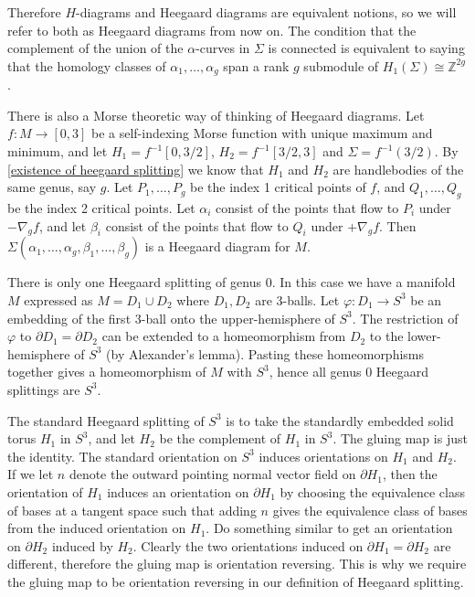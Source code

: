 Therefore $H$-diagrams and Heegaard diagrams are equivalent notions, so we will refer to both as Heegaard diagrams from now on. The condition that the complement of the union of the $\alpha$-curves in $\Sigma$ is connected is equivalent to saying that the homology classes of $\alpha_1,\ldots,\alpha_g$ span a rank $g$ submodule of $H_1(\Sigma) \cong \mathbb Z^{2g}$. 

There is also a Morse theoretic way of thinking of Heegaard diagrams. Let $f : M \rightarrow [0,3]$ be a self-indexing Morse function with unique maximum and minimum, and let $H_1 = f^{-1}[0,3/2]$, $H_2 = f^{-1}[3/2,3]$ and $\Sigma = f^{-1}(3/2)$. By \cref{existence of heegaard splitting} we know that $H_1$ and $H_2$ are handlebodies of the same genus, say $g$. Let $P_1,\ldots,P_g$ be the index 1 critical points of $f$, and $Q_1,\ldots,Q_g$ be the index 2 critical points. Let $\alpha_i$ consist of the points that flow to $P_i$ under $-\nabla_g f$, and let $\beta_i$ consist of the points that flow to $Q_i$ under $+\nabla_g f$. Then $\Sigma(\alpha_1,\ldots,\alpha_g,\beta_1,\ldots,\beta_g)$ is a Heegaard diagram for $M$.

\begin{example}
There is only one Heegaard splitting of genus 0. In this case we have a manifold $M$ expressed as $M = D_1 \cup D_2$ where $D_1,D_2$ are 3-balls. Let $\varphi : D_1 \rightarrow S^3$ be an embedding of the first 3-ball onto the upper-hemisphere of $S^3$. The restriction of $\varphi$ to $\partial D_1 = \partial D_2$ can be extended to a homeomorphism from $D_2$ to the lower-hemisphere of $S^3$ (by Alexander's lemma). Pasting these homeomorphisms together gives a homeomorphism of $M$ with $S^3$, hence all genus 0 Heegaard splittings are $S^3$. 
\end{example}

\begin{example}
The standard Heegaard splitting of $S^3$ is to take the standardly embedded solid torus $H_1$ in $S^3$, and let $H_2$ be the complement of $H_1$ in $S^3$. The gluing map is just the identity. The standard orientation on $S^3$ induces orientations on $H_1$ and $H_2$. If we let $n$ denote the outward pointing normal vector field on $\partial H_1$, then the orientation of $H_1$ induces an orientation on $\partial H_1$ by choosing the equivalence class of bases at a tangent space such that adding $n$ gives the equivalence class of bases from the induced orientation on $H_1$. Do something similar to get an orientation on $\partial H_2$ induced by $H_2$. Clearly the two orientations induced on $\partial H_1 = \partial H_2$ are different, therefore the gluing map is orientation reversing. This is why we require the gluing map to be orientation reversing in our definition of Heegaard splitting.
\end{example}

